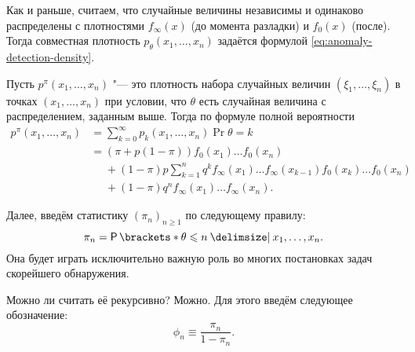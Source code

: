 Как и раньше, считаем, что случайные величины независимы и одинаково распределены с плотностями \(f_{\infty}(x)\) (до момента разладки) и \(f_{0}(x)\) (после). 
Тогда совместная плотность \(p_{\theta}(x_{1}, \ldots, x_{n})\) задаётся формулой \eqref{eq:anomaly-detection-density}.

Пусть \(p^{\pi}(x_{1}, \ldots, x_{n})\) "--- это плотность набора случайных величин \((\xi_{1}, \ldots, \xi_{n})\) в точках \((x_{1}, \ldots, x_{n})\) при условии, что \(\theta\) есть случайная величина с распределением, заданным выше. 
Тогда по формуле полной вероятности
\begin{align*}
	p^{\pi}(x_{1}, \ldots, x_{n}) 
	&= \sum_{k = 0}^{\infty} p_{k}(x_{1}, \ldots, x_{n})\Pr{\theta = k} \\
	&= (\pi + p(1 - \pi)) f_{0}(x_{1}) \ldots f_{0}(x_{n}) \\
	&\phantom{=} + (1 - \pi)p\sum_{k = 1}^{n} q^{k} f_{\infty}(x_{1}) \ldots f_{\infty}(x_{k - 1}) f_{0}(x_{k}) \ldots f_{0}(x_{n}) \\
	&\phantom{=} + (1 - \pi)q^{n} f_{\infty}(x_{1}) \ldots f_{\infty}(x_{n}).
\end{align*}

Далее, введём статистику \((\pi_{n})_{n \geq 1}\) по следующему правилу:
\[
	\pi_{n}
	= \Pr{\theta \leq n \given x_{1}, \ldots, x_{n}}.
\]
Она будет играть исключительно важную роль во многих постановках задач скорейшего обнаружения.

Можно ли считать её рекурсивно? 
Можно. 
Для этого введём следующее обозначение:
\[
	\phi_{n} 
	\equiv \frac{\pi_{n}}{1 - \pi_{n}}.
\]

